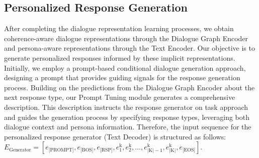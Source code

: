 \documentclass[letterpaper]{article} %
\begin{document}
\subsection{Personalized Response Generation}
After completing the dialogue representation learning processes, we obtain coherence-aware dialogue representations through the Dialogue Graph Encoder and persona-aware representations through the Text Encoder. Our objective is to generate personalized responses informed by these implicit representations. Initially, we employ a prompt-based conditional dialogue generation approach, designing a prompt that provides guiding signals for the response generation process. Building on the predictions from the Dialogue Graph Encoder about the next response type, our Prompt Tuning module generates a comprehensive description. This description instructs the response generator on task approach and guides the generation process by specifying response types, leveraging both dialogue context and persona information. Therefore, the input sequence for the personalized response generator (Text Decoder) is structured as follows: $E_{\text{Generator}} = [e_{\text{[PROMPT]}}, e_{\text{[BOS]}}, e_{\text{[RSP]}}, e_{\text{1}}^{\text{k}}, e_{\text{2}}^{\text{k}}, ... , e_{|\text{K}|-1}^{\text{k}}, e_{|\text{K}|}^{\text{k}}, e_{\text{[EOS]}}]$.

\end{document}
